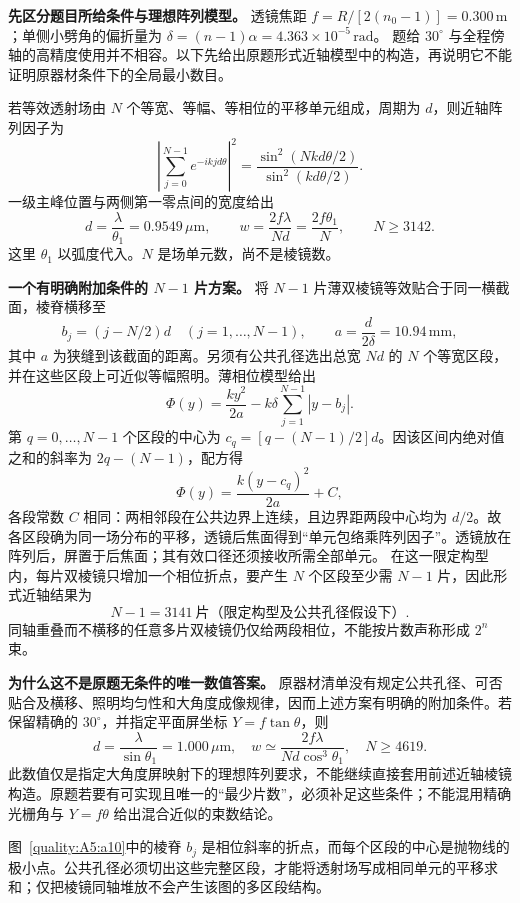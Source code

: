 \begin{advsolution}
\textbf{先区分题目所给条件与理想阵列模型。}
透镜焦距 $f=R/[2(n_0-1)]=0.300\,\mathrm m$；单侧小劈角的偏折量为
$\delta=(n-1)\alpha=4.363\times10^{-5}\,\mathrm{rad}$。
题给 $30^\circ$ 与全程傍轴的高精度使用并不相容。以下先给出原题形式近轴模型中的构造，再说明它不能证明原器材条件下的全局最小数目。

若等效透射场由 $N$ 个等宽、等幅、等相位的平移单元组成，周期为 $d$，则近轴阵列因子为
\[
 \left|\sum_{j=0}^{N-1}e^{-ikjd\theta}\right|^2
 =\frac{\sin^2(Nkd\theta/2)}{\sin^2(kd\theta/2)}.
\]
一级主峰位置与两侧第一零点间的宽度给出
\[
 d=\frac{\lambda}{\theta_1}=0.9549\,\mu\mathrm m,
 \qquad w=\frac{2f\lambda}{Nd}=\frac{2f\theta_1}{N},
 \qquad \boxed{N\ge3142}.
\]
这里 $\theta_1$ 以弧度代入。$N$ 是场单元数，尚不是棱镜数。

\textbf{一个有明确附加条件的 $N-1$ 片方案。}
将 $N-1$ 片薄双棱镜等效贴合于同一横截面，棱脊横移至
\[
 b_j=(j-N/2)d\quad(j=1,\ldots,N-1),
 \qquad a=\frac{d}{2\delta}=10.94\,\mathrm{mm},
\]
其中 $a$ 为狭缝到该截面的距离。另须有公共孔径选出总宽 $Nd$ 的 $N$ 个等宽区段，并在这些区段上可近似等幅照明。薄相位模型给出
\[
 \Phi(y)=\frac{ky^2}{2a}-k\delta\sum_{j=1}^{N-1}|y-b_j|.
\]
第 $q=0,\ldots,N-1$ 个区段的中心为 $c_q=[q-(N-1)/2]d$。因该区间内绝对值之和的斜率为 $2q-(N-1)$，配方得
\[
 \Phi(y)=\frac{k(y-c_q)^2}{2a}+C,
\]
各段常数 $C$ 相同：两相邻段在公共边界上连续，且边界距两段中心均为 $d/2$。故各区段确为同一场分布的平移，透镜后焦面得到“单元包络乘阵列因子”。透镜放在阵列后，屏置于后焦面；其有效口径还须接收所需全部单元。
在这一限定构型内，每片双棱镜只增加一个相位折点，要产生 $N$ 个区段至少需 $N-1$ 片，因此形式近轴结果为
\[
 \boxed{N-1=3141\ \text{片（限定构型及公共孔径假设下）}}.
\]
同轴重叠而不横移的任意多片双棱镜仍仅给两段相位，不能按片数声称形成 $2^n$ 束。

\textbf{为什么这不是原题无条件的唯一数值答案。}
原器材清单没有规定公共孔径、可否贴合及横移、照明均匀性和大角度成像规律，因而上述方案有明确的附加条件。若保留精确的 $30^\circ$，并指定平面屏坐标 $Y=f\tan\theta$，则
\[
 d=\frac{\lambda}{\sin\theta_1}=1.000\,\mu\mathrm m,
 \quad w\simeq\frac{2f\lambda}{Nd\cos^3\theta_1},
 \quad N\ge4619.
\]
此数值仅是指定大角度屏映射下的理想阵列要求，不能继续直接套用前述近轴棱镜构造。原题若要有可实现且唯一的“最少片数”，必须补足这些条件；不能混用精确光栅角与 $Y=f\theta$ 给出混合近似的束数结论。


图~\ref{quality:A5:a10}中的棱脊 $b_j$ 是相位斜率的折点，而每个区段的中心是抛物线的极小点。公共孔径必须切出这些完整区段，才能将透射场写成相同单元的平移求和；仅把棱镜同轴堆放不会产生该图的多区段结构。
\end{advsolution}

